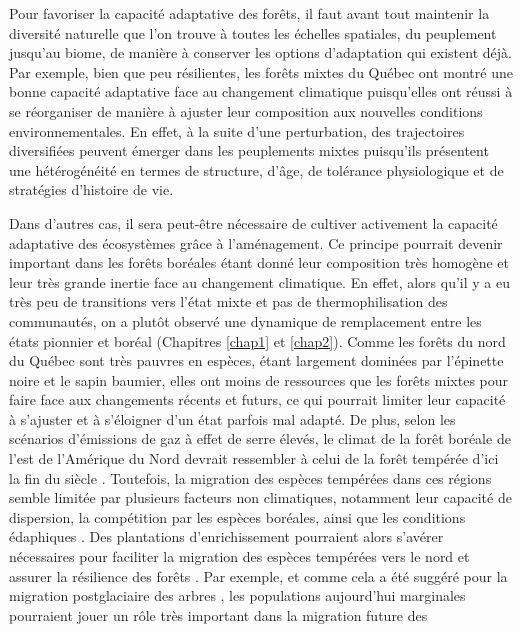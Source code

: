 Pour favoriser la capacité adaptative des forêts, il faut avant tout
maintenir la diversité naturelle que l'on trouve à toutes les échelles
spatiales, du peuplement jusqu'au biome, de manière à conserver les
options d'adaptation qui existent déjà. Par exemple, bien que peu
résilientes, les forêts mixtes du Québec ont montré une bonne capacité
adaptative face au changement climatique puisqu'elles ont réussi à se
réorganiser de manière à ajuster leur composition aux nouvelles
conditions environnementales. En effet, à la suite d'une perturbation,
des trajectoires diversifiées peuvent émerger dans les peuplements
mixtes puisqu'ils présentent une hétérogénéité en termes de structure,
d'âge, de tolérance physiologique et de stratégies d'histoire de vie.

Dans d'autres cas, il sera peut-être nécessaire de cultiver activement
la capacité adaptative des écosystèmes grâce à l'aménagement. Ce
principe pourrait devenir important dans les forêts boréales étant donné
leur composition très homogène et leur très grande inertie face au
changement climatique. En effet, alors qu'il y a eu très peu de
transitions vers l'état mixte et pas de thermophilisation des
communautés, on a plutôt observé une dynamique de remplacement entre les
états pionnier et boréal (Chapitres \ref{chap1} et \ref{chap2}). Comme
les forêts du nord du Québec sont très pauvres en espèces, étant
largement dominées par l'épinette noire et le sapin baumier, elles ont
moins de ressources que les forêts mixtes pour faire face aux
changements récents et futurs, ce qui pourrait limiter leur capacité à
s'ajuster et à s'éloigner d'un état parfois mal adapté. De plus, selon
les scénarios d'émissions de gaz à effet de serre élevés, le climat de
la forêt boréale de l'est de l'Amérique du Nord devrait ressembler à
celui de la forêt tempérée d'ici la fin du siècle
\citep{gauthier_boreal_2015}. Toutefois, la migration des espèces
tempérées dans ces régions semble limitée par plusieurs facteurs non
climatiques, notamment leur capacité de dispersion, la compétition par
les espèces boréales, ainsi que les conditions édaphiques
\citep[Chapitre
\ref{chap3};][]{carteron_soil_2020, solarik_priority_2019}. Des
plantations d'enrichissement pourraient alors s'avérer nécessaires pour
faciliter la migration des espèces tempérées vers le nord et assurer la
résilience des forêts \citep{duveneck_measuring_2016}. Par exemple, et
comme cela a été suggéré pour la migration postglaciaire des arbres
\citep{mclachlan_molecular_2005}, les populations aujourd'hui marginales
pourraient jouer un rôle très important dans la migration future des
